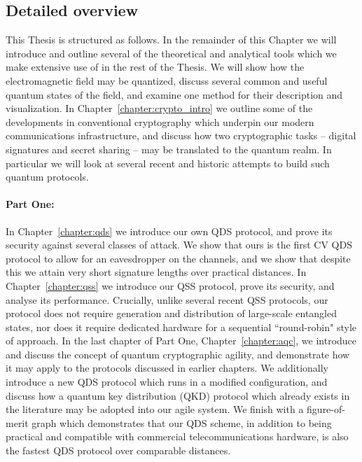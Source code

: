 \subsection*{Detailed overview}

This Thesis is structured as follows. In the remainder of this Chapter we will introduce and outline several of the theoretical and analytical tools which we make extensive use of in the rest of the Thesis. We will show how the electromagnetic field may be quantized, discuss several common and useful quantum states of the field, and examine one method for their description and visualization. In Chapter~\ref{chapter:crypto_intro} we outline some of the developments in conventional cryptography which underpin our modern communications infrastructure, and discuss how two cryptographic tasks -- digital signatures and secret sharing -- may be translated to the quantum realm. In particular we will look at several recent and historic attempts to build such quantum protocols.

\paragraph{Part One:} In Chapter~\ref{chapter:qds} we introduce our own QDS protocol, and prove its security against several classes of attack. We show that ours is the first CV QDS protocol to allow for an eavesdropper on the channels, and we show that despite this we attain very short signature lengths over practical distances. In Chapter~\ref{chapter:qss} we introduce our QSS protocol, prove its security, and analyse its performance. Crucially, unlike several recent QSS protocols, our protocol does not require generation and distribution of large-scale entangled states, nor does it require dedicated hardware for a sequential ``round-robin" style of approach. In the last chapter of Part One, Chapter~\ref{chapter:aqc}, we introduce and discuss the concept of quantum cryptographic agility, and demonstrate how it may apply to the protocols discussed in earlier chapters. We additionally introduce a new QDS protocol which runs in a modified configuration, and discuss how a quantum key distribution (QKD) protocol which already exists in the literature may be adopted into our agile system. We finish with a figure-of-merit graph which demonstrates that our QDS scheme, in addition to being practical and compatible with commercial telecommunications hardware, is also the fastest QDS protocol over comparable distances. 

